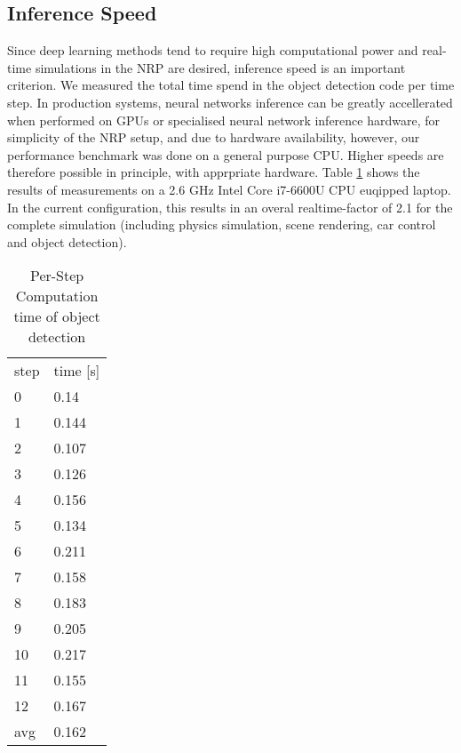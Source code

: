 \subsection{Inference Speed}
Since deep learning methods tend to require high computational power and real-time simulations in the NRP are desired, inference speed is an important criterion. 
We measured the total time spend in the object detection code per time step. 
In production systems, neural networks inference can be greatly accellerated when performed on GPUs or specialised neural network inference hardware, for simplicity of the NRP setup, and due to hardware availability, however, our performance benchmark was done on a general purpose CPU. 
Higher speeds are therefore possible in principle, with apprpriate hardware. 
Table \ref{tab:inference_time} shows the results of measurements on a 2.6 GHz Intel Core i7-6600U CPU euqipped laptop.
In the current configuration, this results in an overal realtime-factor of 2.1 for the complete simulation (including physics simulation, scene rendering, car control and object detection).

\begin{table}[htpb]
    \caption[Computational Cost]{Per-Step Computation time of object detection}
    \label{tab:inference_time}
    \centering
    \begin{tabular}{l l}
    step &  time [s] \\
    \cline{1-2}
	0	& 0.14 \\
	1	& 0.144 \\
	2	& 0.107 \\
	3	& 0.126 \\
	4	& 0.156 \\
	5	& 0.134 \\
	6	& 0.211 \\
	7	& 0.158 \\
	8	& 0.183 \\
	9	& 0.205 \\
	10	& 0.217 \\
	11	& 0.155 \\
	12	& 0.167 \\
    \cline{1-2}
    avg & 0.162 \\
    \cline{1-2}
    \end{tabular}
\end{table}



